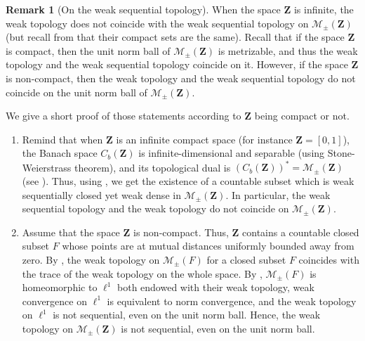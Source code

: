 \documentclass{amsart}
\theoremstyle{plain}
\theoremstyle{definition}
\newtheorem{remark}[Th]{Remark}
\newcommand{\Space}{\mathbf{Z}}
\newcommand{\SignedMeas}{\mathcal{M}_{\pm}(\Space)}
\newcommand{\SignedMeasX}[1]{\mathcal{M}_{\pm}(#1)}
\newcommand{\CbFunct}{C_b(\Space)}
\begin{document}
	
\begin{remark}[On the weak sequential topology]
  \label{rem:topo2}
  When the space $\Space$ is infinite, the weak topology does not coincide with the weak sequential topology
  	on $\SignedMeas$ (but recall from  that their compact sets are the same).
  Recall that  if the space $\Space$  is compact,  then  the unit norm ball  of $\SignedMeas$ is metrizable,
  	and thus the weak topology and the weak sequential topology coincide on it.
  However, if the space $\Space$ is non-compact, then the weak topology and the weak sequential topology
  	do not coincide on the unit norm ball of $\SignedMeas$.

        We give a short proof of those statements according to $\Space $ being
        compact or not.
        
\begin{enumerate}[label=(\roman*)]
   \item  Remind  that when  $\Space$ is  an infinite  compact space  (for
        instance  $\Space=[0,1]$),   the  Banach  space   $\CbFunct$  is
        infinite-dimensional  and   separable  (using  Stone-Weierstrass
        theorem),      and       its      topological       dual      is
        $(\CbFunct)^*     =      \SignedMeas$     (see     \cite[Theorem
        1.3.3]{Bogachev}).        Thus,        using       \cite[Theorem
        2.5]{humphreysSeparableBanachSpace1996}, we get the existence of
        a  countable subset  which is  weak sequentially  closed yet
        weak dense  in $\SignedMeas$.   In particular,  the weak
        sequential topology and the weak topology do not coincide on
        $\SignedMeas$.

      \item  Assume  that  the  space $\Space$  is  non-compact.   Thus,
        $\Space$ contains a countable closed subset $F$ whose points are
        at  mutual  distances  uniformly  bounded away  from  zero.   By
        \cite[Remark    3.1.7]{Bogachev},   the    weak   topology    on
        $\SignedMeasX{F}$  for a  closed subset  $F$ coincides  with the
        trace of the weak topology on the whole space.  By \cite[Section
        3.1,  p. 102]{Bogachev},  $\SignedMeasX{F}$  is homeomorphic  to
        $\ell^1$ both endowed with their weak topology, weak convergence
        on  $\ell^1$ is  equivalent to  norm convergence,  and the  weak
        topology on  $\ell^1$ is not  sequential, even on the  unit norm
        ball.   Hence,  the  weak   topology  on  $\SignedMeas$  is  not
        sequential, even on the unit norm ball.

      \end{enumerate}
    \end{remark}
 
\end{document}
